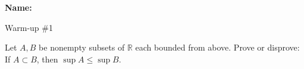 \documentclass[12pt]{article}
\begin{document}
\noindent \textbf{Name:} 

\begin{center}
Warm-up \#1
\end{center}

\noindent Let $A, B$ be nonempty subsets of $\mathbb{R}$ each bounded from above. Prove or disprove: If $A \subset B$, then $\sup A \leqslant \sup B$.
\end{document}
